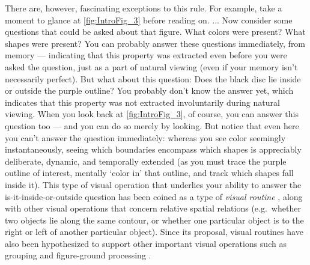 There are, however, fascinating exceptions to this rule.  For example, take a moment to glance at \cref{fig:IntroFig_3} before reading on. ... Now consider some questions that could be asked about that figure.  What colors were present?  What shapes were present?  You can probably answer these questions immediately, from memory — indicating that this property was extracted even before you were asked the question, just as a part of natural viewing (even if your memory isn’t necessarily perfect).  But what about this question: Does the black disc lie inside or outside the purple outline?  You probably don’t know the answer yet, which indicates that this property was not extracted involuntarily during natural viewing.  When you look back at \cref{fig:IntroFig_3}, of course, you can answer this question too --- and you can do so merely by looking.  But notice that even here you can’t answer the question immediately: whereas you see color seemingly instantaneously, seeing which boundaries encompass which shapes is appreciably deliberate, dynamic, and temporally extended (as you must trace the purple outline of interest, mentally ‘color in’ that outline, and track which shapes fall inside it).  This type of visual operation that underlies your ability to answer the is-it-inside-or-outside question has been coined as a type of \textit{visual routine} \parencite{selst_visual_1995, ullman_visual_1984, ullman_chapter_1996}, along with other visual operations that concern relative spatial relations (e.g.~whether two objects lie along the same contour, or whether one particular object is to the right or left of another particular object). Since its proposal, visual routines have also been hypothesized to support other important visual operations such as grouping \parencite{watt_function_2000} and figure-ground processing \parencite{poort_role_2012}.

